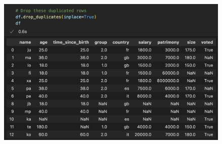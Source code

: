 \begin{frame}
\begin{minipage}{0.58\linewidth}
\begin{figure}[H]
         \includegraphics[scale=.35]{../images/illustrations/data_cleaning_drop_rows_duplicated.png}
      \end{figure}
   \end{minipage}
\end{frame}

